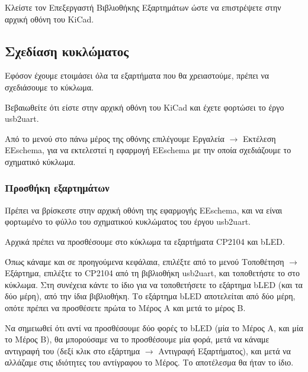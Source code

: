 \documentclass[a4paper]{article}
\begin{document}
Kλείστε τον Επεξεργαστή Βιβλιοθήκης Εξαρτημάτων ώστε να επιστρέψετε στην αρχική οθόνη του \textenglish{KiCad}.


\subsection{Σχεδίαση κυκλώματος}
Εφόσον έχουμε ετοιμάσει όλα τα εξαρτήματα που θα χρειαστούμε, πρέπει να σχεδιάσουμε το κύκλωμα. 

Βεβαιωθείτε ότι είστε στην αρχική οθόνη του \textenglish{KiCad} και έχετε φορτώσει το έργο usb2uart.

Από το μενού στο πάνω μέρος της οθόνης επιλέγουμε Εργαλεία $\rightarrow$ Εκτέλεση \textenglish{EEschema}, για να εκτελεστεί η εφαρμογή \textenglish{EEschema} με την οποία σχεδιάζουμε το σχηματικό κύκλωμα. 

\subsubsection{Προσθήκη εξαρτημάτων}

Πρέπει να βρίσκεστε στην αρχική οθόνη της εφαρμογής \textenglish{EEschema}, και να είναι φορτωμένο το φύλλο του σχηματικού κυκλώματος του έργου usb2uart.

\begin{figure}
  \begin{center}
    \label{fig:kicad-main}
  \end{center}
\end{figure}

Αρχικά πρέπει να προσθέσουμε στο κύκλωμα τα εξαρτήματα \textenglish{CP2104} και b\textenglish{LED}. 

Όπως κάναμε και σε προηγούμενα κεφάλαια, επιλέξτε από το μενού Τοποθέτηση $\rightarrow$ Εξάρτημα, επιλέξτε το \textenglish{CP2104} από τη βιβλιοθήκη usb2uart, και τοποθετήστε το στο κύκλωμα. Στη συνέχεια κάντε το ίδιο για να τοποθετήσετε το εξάρτημα b\textenglish{LED} (και τα δύο μέρη), από την ίδια βιβλιοθήκη. Το εξάρτημα b\textenglish{LED} αποτελείται από δύο μέρη, οπότε πρέπει να προσθέσετε πρώτα το Μέρος Α και μετά το μέρος Β.

Να σημειωθεί ότι αντί να προσθέσουμε δύο φορές το b\textenglish{LED} (μία το Μέρος Α, και μία το Μέρος Β), θα μπορούσαμε να το προσθέσουμε μία φορά, μετά να κάναμε αντιγραφή του (δεξί κλικ στο εξάρτημα $\rightarrow$ Αντιγραφή Εξαρτήματος), και μετά να αλλάζαμε στις ιδιότητες του αντίγραφου το Μέρος. Το αποτέλεσμα θα ήταν το ίδιο.
\end{document}
